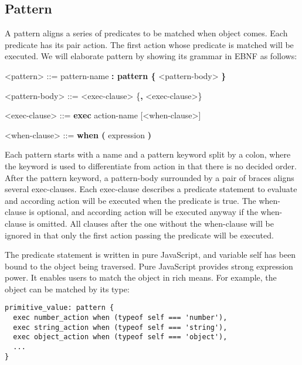 \subsection {Pattern}
A pattern aligns a series of predicates to be matched when object comes. Each predicate has its pair action. The first action whose predicate is matched will be executed. We will elaborate pattern by showing its grammar in EBNF as follows:

\begin{center}
  \begin{minipage}{0.8\linewidth}
    \begin{grammar}
      <pattern> ::= pattern-name \textbf{: pattern \{} <pattern-body> \textbf{\}}

      <pattern-body> ::= <exec-clause> \{\textbf{,} <exec-clause>\}

      <exec-clause> ::= \textbf{exec} action-name [<when-clause>]

      <when-clause> ::= \textbf{when (} expression \textbf{)}
    \end{grammar}
  \end{minipage}
\end{center}

Each pattern starts with a name and a pattern keyword split by a colon, where the keyword is used to differentiate from action in that there is no decided order. After the pattern keyword, a pattern-body surrounded by a pair of braces aligns several exec-clauses. Each exec-clause describes a predicate statement to evaluate and according action will be executed when the predicate is true. The when-clause is optional, and according action will be executed anyway if the when-clause is omitted. All clauses after the one without the when-clause will be ignored in that only the first action passing the predicate will be executed.

The predicate statement is written in pure JavaScript, and variable self has been bound to the object being traversed. Pure JavaScript provides strong expression power. It enables users to match the object in rich means. For example, the object can be matched by its type:

\begin{lstlisting}
primitive_value: pattern {
  exec number_action when (typeof self === 'number'),
  exec string_action when (typeof self === 'string'),
  exec object_action when (typeof self === 'object'),
  ...
}
\end{lstlisting}

